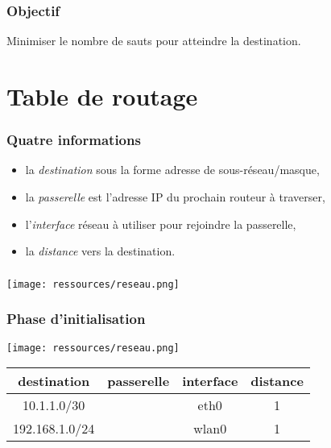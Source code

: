 \documentclass[svgnames,11pt]{beamer}
\begin{document}
\begin{frame}
    \frametitle{Objectif}

    Minimiser le nombre de sauts pour atteindre la destination.

\end{frame}

\section{Table de routage}
\begin{frame}
    \frametitle{Quatre informations}

    \begin{itemize}
        \item la \emph{destination} sous la forme adresse de sous-réseau/masque,
        \item la \emph{passerelle} est l'adresse IP du prochain routeur à traverser,
        \item l'\emph{interface} réseau à utiliser pour rejoindre la passerelle,
        \item la \emph{distance} vers la destination.
    \end{itemize}

\end{frame}

\begin{frame}
    \frametitle{}

    \begin{center}
        \centering
        \texttt{[image: ressources/reseau.png]}
        \label{reseau}
    \end{center}

\end{frame}

\begin{frame}
    \frametitle{Phase d'initialisation}
    \begin{center}
        \centering
        \texttt{[image: ressources/reseau.png]}
        \label{reseau}
    \end{center}
\begin{center}
    \begin{tabular}{|*{4}{c|}}
        \hline
        destination    & passerelle & interface & distance \\
        \hline
        10.1.1.0/30    &            & eth0      & 1        \\
        \hline
        192.168.1.0/24 &            & wlan0     & 1        \\
        \hline
    \end{tabular}
\end{center}
\end{frame}
\end{document}
